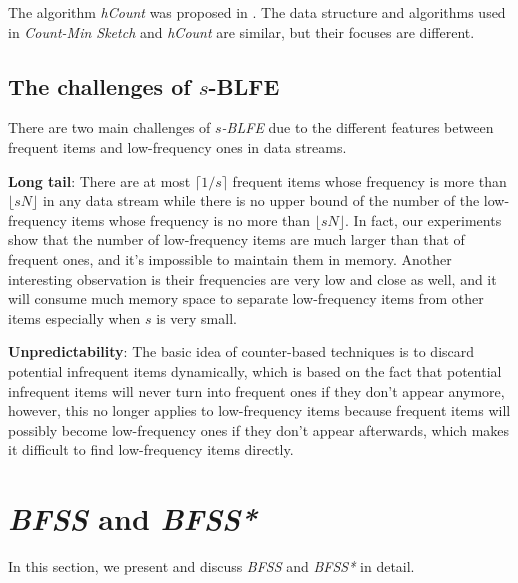 \documentclass[conference]{IEEEtran}
\begin{document}
The algorithm \emph{hCount} was proposed in \cite{IEEEexample:hcount}. The data structure and algorithms used in \emph{Count-Min Sketch} and \emph{hCount} are similar, but their focuses are different.


\subsection{The challenges of $s$-BLFE}
There are two main challenges of \emph{$s$-BLFE} due to the different features between frequent items and low-frequency ones in data streams.\par

\textbf{Long tail}: There are at most $\lceil1/s\rceil$ frequent items whose frequency is more than $\lfloor sN\rfloor$ in any data stream while there is no upper bound of the number of the low-frequency items whose frequency is no more than $\lfloor sN\rfloor$. In fact, our experiments show that the number of low-frequency items are much larger than that of frequent ones, and it's impossible to maintain them in memory. Another interesting observation is their frequencies are very low and close as well, and it will consume much memory space to separate low-frequency items from other items especially when $s$ is very small.\par

\textbf{Unpredictability}: The basic idea of counter-based techniques is to discard potential infrequent items dynamically, which is based on the fact that potential infrequent items will never turn into frequent ones if they don't appear anymore, however, this no longer applies to low-frequency items because frequent items will possibly become low-frequency ones if they don't appear afterwards, which makes it difficult to find low-frequency items directly.
\section{\emph{BFSS} and \emph{BFSS*}}
In this section, we present and discuss \emph{BFSS} and \emph{BFSS*} in detail.
\end{document}
